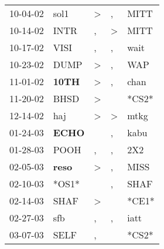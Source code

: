 \begin{supertabular}{p{0.07\textwidth}p{0.06\textwidth}p{0.02\textwidth}p{0.02\textwidth}p{0.06\textwidth}}
          10-04-02\textsuperscript{} &           sol1\textsuperscript{} &     \textgreater &                , &           MITT\textsuperscript{} \\
          10-14-02\textsuperscript{} &           INTR\textsuperscript{} &                , &     \textgreater &           MITT\textsuperscript{} \\
          10-17-02\textsuperscript{} &           VISI\textsuperscript{} &                , &                , &           wait\textsuperscript{} \\
          10-23-02\textsuperscript{} &           DUMP\textsuperscript{} &     \textgreater &                , &            WAP\textsuperscript{} \\
          11-01-02\textsuperscript{} &  \textbf{10TH\textsuperscript{}} &     \textgreater &                , &           chan\textsuperscript{} \\
          11-20-02\textsuperscript{} &           BHSD\textsuperscript{} &     \textgreater &                  &                            *CS2* \\
          12-14-02\textsuperscript{} &            haj\textsuperscript{} &     \textgreater &     \textgreater &           mtkg\textsuperscript{} \\
          01-24-03\textsuperscript{} &  \textbf{ECHO\textsuperscript{}} &                  &                , &           kabu\textsuperscript{} \\
          01-28-03\textsuperscript{} &           POOH\textsuperscript{} &                , &                , &            2X2\textsuperscript{} \\
          02-05-03\textsuperscript{} &  \textbf{reso\textsuperscript{}} &     \textgreater &                , &           MISS\textsuperscript{} \\
          02-10-03\textsuperscript{} &                            *OS1* &                  &                , &           SHAF\textsuperscript{} \\
          02-14-03\textsuperscript{} &           SHAF\textsuperscript{} &     \textgreater &                  &                            *CE1* \\
          02-27-03\textsuperscript{} &            sfb\textsuperscript{} &                , &                , &           iatt\textsuperscript{} \\
          03-07-03\textsuperscript{} &           SELF\textsuperscript{} &                , &                  &                            *CS2* \\

\end{supertabular}
